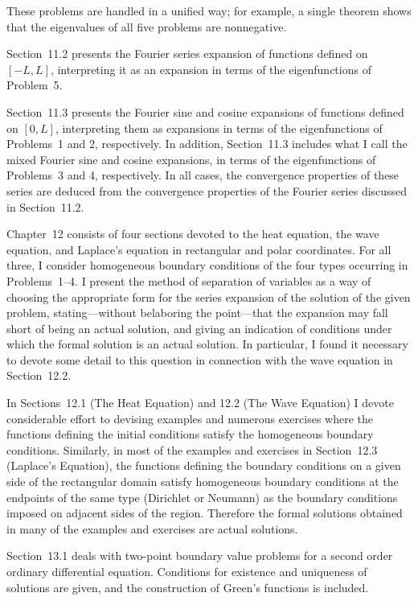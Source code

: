 These problems are handled in a unified way; for example, a single theorem shows that the
eigenvalues of all five problems are nonnegative.

Section~11.2 presents the Fourier series expansion of functions defined on $[-L,L]$, interpreting it
as an expansion in terms of the eigenfunctions of Problem~5.

Section~11.3 presents the Fourier sine and cosine expansions of functions defined on $[0,L]$,
interpreting them as expansions in terms of the eigenfunctions of Problems~1 and 2, respectively. In
addition, Section~11.3 includes what I call the mixed Fourier sine and cosine expansions, in terms
of the eigenfunctions of Problems~3 and 4, respectively. In all cases, the convergence properties of
these series are deduced from the convergence properties of the Fourier series discussed in
Section~11.2.

Chapter~12 consists of four sections devoted to the heat equation, the wave equation, and Laplace's
equation in rectangular and polar coordinates. For all three, I consider homogeneous boundary
conditions of the four types occurring in Problems~1--4. I present the method of separation of
variables as a way of choosing the appropriate form for the series expansion of the solution of the
given problem, stating---without belaboring the point---that the expansion may fall short of being
an actual solution, and giving an indication of conditions under which the formal solution is an
actual solution. In particular, I found it necessary to devote some detail to this question in
connection with the wave equation in Section~12.2.

In Sections~12.1 (The Heat Equation) and 12.2 (The Wave Equation) I devote considerable effort to
devising examples and numerous exercises where the functions defining the initial conditions satisfy
the homogeneous boundary conditions. Similarly, in most of the examples and exercises in
Section~12.3 (Laplace's Equation), the functions defining the boundary conditions on a given side of
the rectangular domain satisfy homogeneous boundary conditions at the endpoints of the same type
(Dirichlet or Neumann) as the boundary conditions imposed on adjacent sides of the region. Therefore
the formal solutions obtained in many of the examples and exercises are actual solutions.

Section~13.1 deals with two-point boundary value problems for a second order ordinary differential
equation. Conditions for existence and uniqueness of solutions are given, and the construction of
Green's functions is included.

